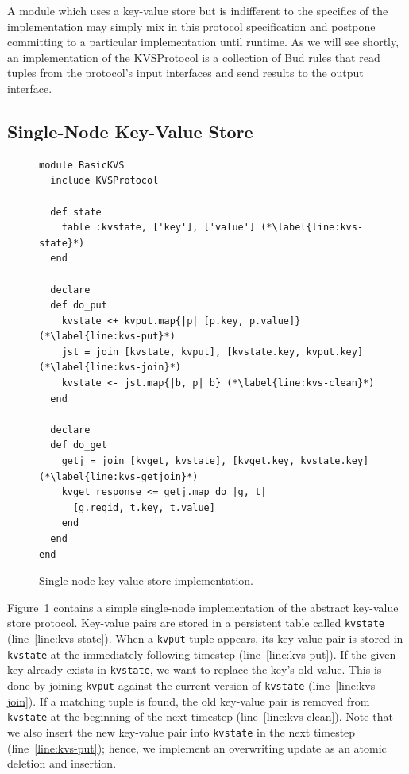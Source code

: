 A module which uses a key-value store but is indifferent to the specifics of the
implementation may simply mix in this protocol specification and postpone
committing to a particular implementation until runtime. As we will see shortly,
an implementation of the KVSProtocol is a collection of Bud rules that read
tuples from the protocol's input interfaces and send results to the output
interface.

\subsection{Single-Node Key-Value Store}
\label{sec:simple-kvs}
\begin{figure}[t]
\begin{scriptsize}
\begin{lstlisting}
module BasicKVS
  include KVSProtocol

  def state
    table :kvstate, ['key'], ['value'] (*\label{line:kvs-state}*)
  end

  declare
  def do_put
    kvstate <+ kvput.map{|p| [p.key, p.value]} (*\label{line:kvs-put}*)
    jst = join [kvstate, kvput], [kvstate.key, kvput.key] (*\label{line:kvs-join}*)
    kvstate <- jst.map{|b, p| b} (*\label{line:kvs-clean}*)
  end

  declare
  def do_get
    getj = join [kvget, kvstate], [kvget.key, kvstate.key] (*\label{line:kvs-getjoin}*)
    kvget_response <= getj.map do |g, t|
      [g.reqid, t.key, t.value]
    end
  end
end
\end{lstlisting}
\centering
\vspace{-10pt}
\caption{Single-node key-value store implementation.}
\label{fig:kvs-impl}
\end{scriptsize}
\vspace{-2pt}
\end{figure}

Figure~\ref{fig:kvs-impl} contains a simple single-node implementation of the
abstract key-value store protocol. Key-value pairs are stored in a persistent
table called \texttt{kvstate} (line~\ref{line:kvs-state}). When a \texttt{kvput}
tuple appears, its key-value pair is stored in \texttt{kvstate} at the immediately
following timestep (line~\ref{line:kvs-put}).  If the given key already exists in
\texttt{kvstate}, we want to replace the key's old value. This is done by
joining \texttt{kvput} against the current version of \texttt{kvstate}
(line~\ref{line:kvs-join}). If a matching tuple is found, the old key-value pair
is removed from \texttt{kvstate} at the beginning of the next timestep
(line~\ref{line:kvs-clean}). Note that we also insert the new key-value pair
into \texttt{kvstate} in the next timestep (line~\ref{line:kvs-put});
hence, we implement an overwriting update as an atomic deletion and insertion.

